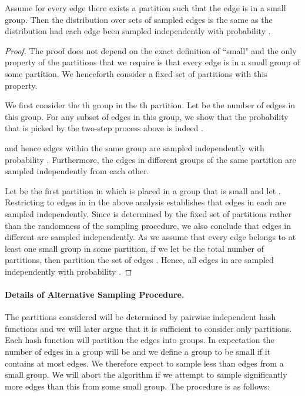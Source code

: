 \documentclass[11pt]{article}
\begin{document}
\begin{lemma}
Assume for every edge there exists a partition such that the edge is in a small group. Then the distribution over sets of sampled edges is the same as the distribution had each edge been sampled independently with probability .
\end{lemma}
\begin{proof}
The proof does not depend on the exact definition of ``small" and the only property of the partitions that we require is that every edge is in a small group of some partition. We henceforth consider a fixed set of partitions with this property.

We first consider the th group in the th partition. Let  be the number of edges in this group. For any subset  of  edges in this group, we show that the probability that  is picked by the two-step process above is indeed . 

and hence  edges within the same group are sampled independently with probability . Furthermore, the edges in different groups of the same partition are sampled independently from each other.
 
Let  be the first partition in which  is placed in a group that is small and let . 
Restricting  to edges in  in the above analysis establishes that edges in each  are sampled independently. Since  is determined by the fixed set  of partitions rather than the randomness of the sampling procedure, we also conclude that edges in different  are sampled independently.  As we assume that every edge belongs to at least one small group in some partition, if we let  be the total number of partitions, then  partition the set of edges . Hence, all edges in  are sampled independently with probability .
\end{proof}


\paragraph{Details of Alternative Sampling Procedure.}
The partitions considered will be determined by pairwise independent hash functions and we will later argue that it is sufficient to consider only  partitions. Each hash function will partition the  edges into  groups. In expectation the number of edges in a group will be  and we define a  group to be small if it contains at most  edges. We therefore expect to sample less than   edges from a small group. We will abort the algorithm if we attempt to sample significantly more edges than this from some small group. The procedure is as follows:
\end{document}
